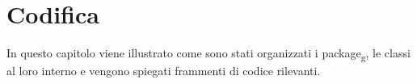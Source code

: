 \chapter{Codifica}
\label{cap:codifica}

In questo capitolo viene illustrato come sono stati organizzati i package\textsubscript{g}, le classi al loro interno e vengono spiegati frammenti di codice rilevanti.\\








